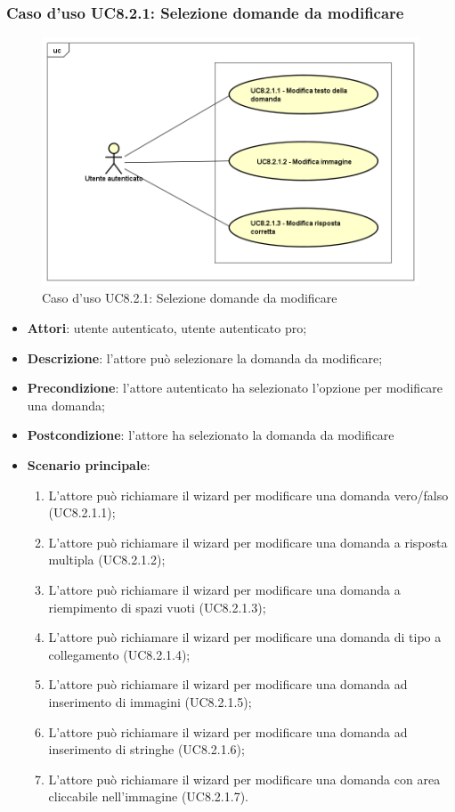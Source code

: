 		\subsubsection{Caso d'uso UC8.2.1: Selezione domande da modificare}
		\label{UC8.2.1}
		\begin{figure}[h]
			\centering
			\includegraphics[scale=0.5,keepaspectratio]{UML/UC8_2_1.png}
			\caption{Caso d'uso UC8.2.1: Selezione domande da modificare}
		\end{figure}
		\FloatBarrier
		\begin{itemize}
			\item \textbf{Attori}: utente autenticato, utente autenticato pro;
			\item \textbf{Descrizione}: l'attore può selezionare la domanda da modificare;
			\item \textbf{Precondizione}: l'attore autenticato ha selezionato l'opzione per modificare una domanda;
			\item \textbf{Postcondizione}: l'attore ha selezionato la domanda da modificare 
			\item \textbf{Scenario principale}: 
					\begin{enumerate}
					\item
					L'attore può richiamare il wizard per modificare una domanda vero/falso (UC8.2.1.1);
					\item
					L'attore può richiamare il wizard per modificare una domanda a risposta multipla (UC8.2.1.2);
					\item
					L'attore può richiamare il wizard per modificare una domanda a riempimento di spazi vuoti (UC8.2.1.3);
					\item
					L'attore può richiamare il wizard per modificare una domanda di tipo a collegamento (UC8.2.1.4);
					\item
					L'attore può richiamare il wizard per modificare una domanda ad inserimento di immagini (UC8.2.1.5);
					\item
					L'attore può richiamare il wizard per modificare una domanda ad inserimento di stringhe (UC8.2.1.6);
					\item
					L'attore può richiamare il wizard per modificare una domanda con area cliccabile nell'immagine (UC8.2.1.7).
	 			\end{enumerate}
			
		\end{itemize}

